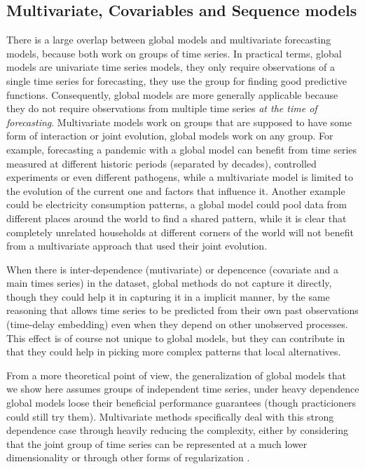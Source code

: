 \documentclass[a4paper]{article}
\theoremstyle{custom}
\begin{document}
\subsection{Multivariate, Covariables and Sequence models}


There is a large overlap between global models and multivariate forecasting models, because both work on groups of time series.
In practical terms, global models are univariate time series models, they only require observations of a single time series for forecasting, they use the group for finding good predictive functions. Consequently, global models are more generally applicable because they do not require observations from multiple time series \textit{at the time of forecasting}.
Multivariate models work on groups that are supposed to have some form of interaction or joint evolution, global models work on any group. For example, forecasting a pandemic with a global model can benefit from time series measured at different historic periods (separated by decades), controlled experiments or even different pathogens, while a multivariate model is limited to the evolution of the current one and factors that influence it. Another example could be electricity consumption patterns, a global model could pool data from different places around the world to find a shared pattern, while it is clear that completely unrelated households at different corners of the world will not benefit from a multivariate approach that used their joint evolution.

When there is inter-dependence (mutivariate) or depencence (covariate and a main times series) in the dataset, global methods do not capture it directly, though they could help it in capturing it in a implicit manner, by the same reasoning that allows time series to be predicted from their own past observations (time-delay embedding) even when they depend on other unobserved processes. This effect is of course not unique to global models, but they can contribute in that they could help in picking more complex patterns that local alternatives.

From a more theoretical point of view, the generalization of global models that we show here assumes groups of independent time series, under heavy dependence global models loose their beneficial performance guarantees (though practicioners could still try them). Multivariate methods specifically deal with this strong dependence case through heavily reducing the complexity, either by considering that the joint group of time series can be represented at a much lower dimensionality or through other forms of regularization \cite{sen2019think, wang2019deep}.
\end{document}

